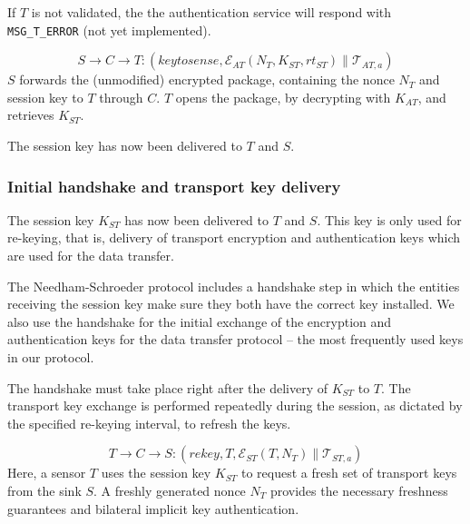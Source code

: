 If $T$ is not validated, the the authentication service will respond with \texttt{MSG\_T\_ERROR} (not yet
implemented).

\[
S \rightarrow C \rightarrow T: (\textit{keytosense},\mathcal{E}_{AT}(N_T,K_{ST},rt_{ST}) \parallel \mathcal{T}_{AT,a})
\]
%
$S$ forwards the (unmodified) encrypted package, containing the nonce $N_T$ and session
key to $T$ through $C$. $T$ opens the package, by decrypting with $K_{AT}$, and retrieves $K_{ST}$.


The session key has now been delivered to $T$ and $S$.

\subsubsection{Initial handshake and transport key delivery}

The session key $K_{ST}$ has now been delivered to $T$ and $S$. This key is only
used for re-keying, that is, delivery of transport encryption and authentication keys
which are used for the data transfer. 

The Needham-Schroeder protocol includes a handshake step in which the entities
receiving the session key make sure they both have the correct key installed. We
also use the handshake for the initial exchange of the
encryption and authentication keys for the data transfer protocol -- the most
frequently used keys in our protocol. 

The handshake must take place right after the delivery of $K_{ST}$ to $T$.
The transport key exchange is performed repeatedly during the session, as dictated by the specified re-keying interval, to refresh the keys.

\[
T \rightarrow C \rightarrow S: (\textit{rekey},T,\mathcal{E}_{ST}(T,N_T) \parallel \mathcal{T}_{ST,a})
\]
%
Here, a sensor $T$ uses the session key $K_{ST}$ to request a fresh set of transport keys from the sink $S$. 
A freshly generated nonce $N_T$ provides the necessary freshness guarantees and bilateral implicit key authentication.

